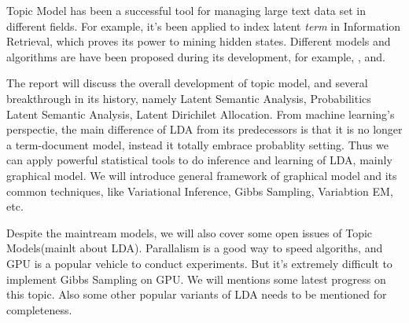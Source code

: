 Topic Model has been a successful tool for managing large text data set in different fields\cite{wallach2006topic}. For example, it's been applied to index latent \emph{term} in Information Retrieval\cite{deerwester1990indexing}, which proves its power to mining hidden states. Different models and algorithms are have been proposed during its development, for example, \cite{dumais1995latent}, \cite{blei2003latent}and\cite{hofmann1999probabilistic}. 

The report will discuss the overall development of topic model, and several breakthrough in its history, namely Latent Semantic Analysis, Probabilitics Latent Semantic Analysis, Latent Dirichilet Allocation. From machine learning's perspectie, the main difference of LDA from its predecessors is that it is no longer a term-document model, instead it totally embrace probablity setting. Thus we can apply powerful statistical tools to do inference and learning of LDA, mainly graphical model. We will introduce general framework of graphical model and its common techniques, like Variational Inference, Gibbs Sampling, Variabtion EM, etc.

Despite the maintream models, we will also cover some open issues of Topic Models(mainlt about LDA). Parallalism is a good way to speed algoriths, and GPU is a popular vehicle to conduct experiments. But it's extremely difficult to implement Gibbs Sampling on GPU. We will mentions some latest progress on this topic. Also some other popular variants of LDA needs to be mentioned for completeness. 

